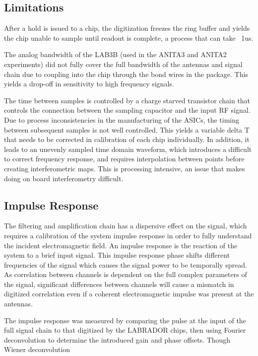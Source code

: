 	
	\subsection{Limitations}
	After a hold is issued to a chip, the digitization freezes the ring buffer and yields the chip unable to sample until readout is complete, a process that can take ~1us.
	
	The analog bandwidth of the LAB3B (used in the ANITA3 and ANITA2 experiments) did not fully cover the full bandwidth of the antennas and signal chain due to coupling into the chip through the bond wires in the package.  This yields a drop-off in sensitivity to high frequency signals.
	
	The time between samples is controlled by a charge starved transistor chain that controls the connection between the sampling capacitor and the input RF signal.  Due to process inconsistencies in the manufacturing of the ASICs, the timing between subsequent samples is not well controlled.  This yields a variable delta T that needs to be corrected in calibration of each chip individually.  In addition, it leads to an unevenly sampled time domain waveform, which introduces a difficult to correct frequency response, and requires interpolation between points before creating interferometric maps.  This is processing intensive, an issue that makes doing on board interferometry difficult.
	
	\subsection{Impulse Response}
	The filtering and amplification chain has a dispersive effect on the signal, which requires a calibration of the system impulse response in order to fully understand the incident electromagnetic field.  An impulse response is the reaction of the system to a brief input signal. This impulse response phase shifts different frequencies of the signal which causes the signal power to be temporally spread.  As correlation between channels is dependent on the full complex parameters of the signal, significant differences between channels will cause a mismatch in digitized correlation even if a coherent electromagnetic impulse was present at the antennas.
	
	The impulse response was measured by comparing the pulse at the input of the full signal chain to that digitized by the LABRADOR chips, then using Fourier deconvolution to determine the introduced gain and phase offsets.  Though Wiener deconvolution 
	
